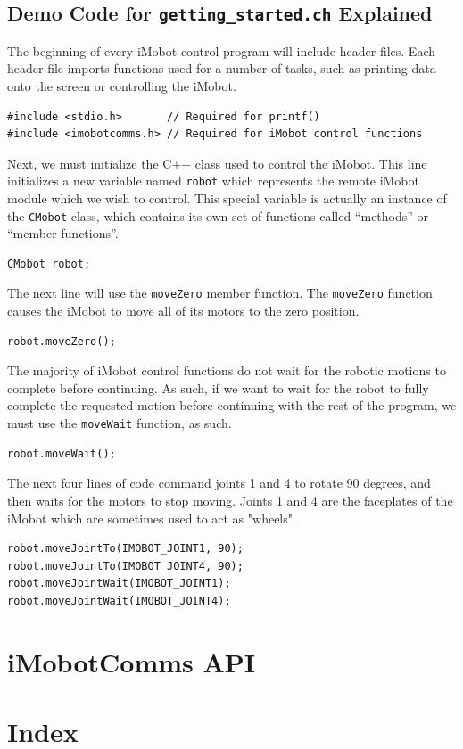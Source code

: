 \documentclass{article}
\begin{document}
\subsection{\label{sec:democode}Demo Code for \texttt{getting\_started.ch} Explained}
The beginning of every iMobot control program will include header files. Each
header file imports functions used for a number of tasks, such as printing
data onto the screen or controlling the iMobot. 

\begin{verbatim}
#include <stdio.h>       // Required for printf()
#include <imobotcomms.h> // Required for iMobot control functions
\end{verbatim}

Next, we must initialize the C++ class used to control the iMobot. This line
initializes a new variable named \texttt{robot} which represents the remote
iMobot module which we wish to control. This special variable is actually an
instance of the \texttt{CMobot} class, which contains its own set of
functions called ``methods'' or ``member functions''.
\begin{verbatim}
CMobot robot;
\end{verbatim}

The next line will use the \texttt{moveZero} member function. The
\texttt{moveZero} function causes the iMobot to move all of its motors to the
zero position.
\begin{verbatim}
robot.moveZero();
\end{verbatim}

The majority of iMobot control functions do not wait for the robotic motions to
complete before continuing. As such, if we want to wait for the robot to fully
complete the requested motion before continuing with the rest of the program,
we must use the \texttt{moveWait} function, as such.
\begin{verbatim}
robot.moveWait();
\end{verbatim}

The next four lines of code command joints 1 and 4 to rotate 90 degrees, and
then waits for the motors to stop moving. Joints 1 and 4 are the faceplates
of the iMobot which are sometimes used to act as "wheels".
\begin{verbatim}
robot.moveJointTo(IMOBOT_JOINT1, 90);
robot.moveJointTo(IMOBOT_JOINT4, 90);
robot.moveJointWait(IMOBOT_JOINT1);
robot.moveJointWait(IMOBOT_JOINT4);
\end{verbatim}

\newpage
\appendix
\section{iMobotComms API}


\section{Index}
\printindex
\end{document}
